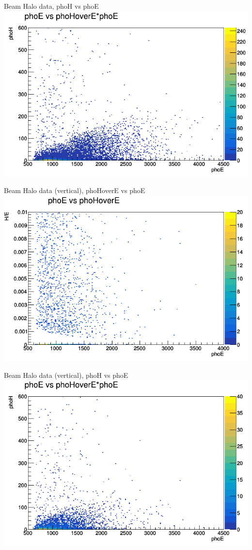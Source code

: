 \documentclass{beamer}
\begin{document}
\begin{frame}{Beam Halo data, phoH vs phoE}
    \includegraphics[width=\linewidth]{phoE_vs_phoH_anTGCtree_data_beamhalo.png}
\end{frame}
\begin{frame}{Beam Halo data (vertical), phoHoverE vs phoE}
    \includegraphics[width=\linewidth]{phoE_vs_phoHoverE_anTGCtree_data_bhvertical.png}
\end{frame}
\begin{frame}{Beam Halo data (vertical), phoH vs phoE}
    \includegraphics[width=\linewidth]{phoE_vs_phoH_anTGCtree_data_bhvertical.png}
\end{frame}
\end{document}
